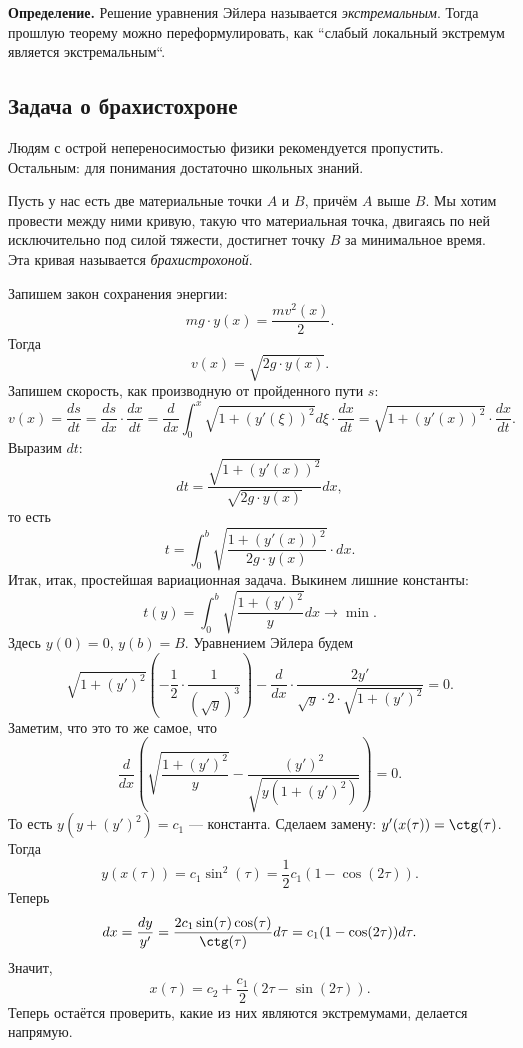 \textbf{Определение.} Решение уравнения Эйлера называется \textit{экстремальным}.
Тогда прошлую теорему можно переформулировать, как ``слабый локальный экстремум является экстремальным``.

\subsection{Задача о брахистохроне}
Людям с острой непереносимостью физики рекомендуется пропустить.
Остальным: для понимания достаточно школьных знаний.

Пусть у нас есть две материальные точки $A$ и $B$, причём $A$ выше $B$.
Мы хотим провести между ними кривую, такую что материальная точка, двигаясь по ней исключительно под силой тяжести, достигнет точку $B$ за минимальное время.
Эта кривая называется \textit{брахистрохоной}.


Запишем закон сохранения энергии:
\[
    mg \cdot y(x) = \frac{m v^2(x)}{2}.
\]
Тогда
\[
    v(x) = \sqrt {2g \cdot y(x)}.
\]
Запишем скорость, как производную от пройденного пути $s$:
\[
    v(x) = \frac{ds}{dt} = \frac{ds}{dx} \cdot \frac{dx}{dt} = \frac{d}{dx} \int_0^x \sqrt{ 1 + (y'(\xi))^2 } d\xi \cdot \frac{dx}{dt} = \sqrt{1 + (y'(x))^2} \cdot \frac{dx}{dt}.
\]
Выразим $dt$:
\[
    dt = \frac{\sqrt{1 + (y'(x))^2}}{\sqrt{2g \cdot y(x)}} dx,
\]
то есть
\[
    t = \int_0^b \sqrt{ \frac{1 + (y'(x))^2}{2g \cdot y(x)}} \cdot dx.
\]
Итак, итак, простейшая вариационная задача.
Выкинем лишние константы:
\[
    t(y) = \int_0^b \sqrt{ \frac{1 + (y')^2}{y}} dx \to \min.
\]
Здесь $y(0) = 0$, $y(b) = B$.
Уравнением Эйлера будем
\[
    \sqrt{1 + (y')^2} \left( -\frac{1}{2} \cdot \frac{1}{(\sqrt y)^3} \right) - \frac{d}{dx} \cdot \frac{2y'}{\sqrt y \cdot 2 \cdot \sqrt{1 + (y')^2}} = 0.
\]
Заметим, что это то же самое, что
\[
    \frac{d}{dx} \left( \sqrt{\frac{1 + (y')^2}{y}} - \frac{(y')^2}{\sqrt{y (1 + (y')^2)}} \right) = 0.
\]
То есть $y(y + (y')^2) = c_1$ --- константа.
Сделаем замену: $y'(x(\tau)) = \ctg(\tau)$.
Тогда 
\[
    y(x(\tau)) = c_1 \sin^2(\tau) = \frac{1}{2} c_1 (1 - \cos(2\tau)).
\]
Теперь
\[
    dx = \frac{dy}{y'} = \frac{2c_1 \sin(\tau) \cos(\tau)}{\ctg(\tau)} d\tau = c_1(1 - \cos(2\tau)) d\tau.
\]
Значит,
\[
    x(\tau) = c_2 + \frac{c_1}{2} (2\tau - \sin(2\tau)).
\]
Теперь остаётся проверить, какие из них являются экстремумами, делается напрямую.

